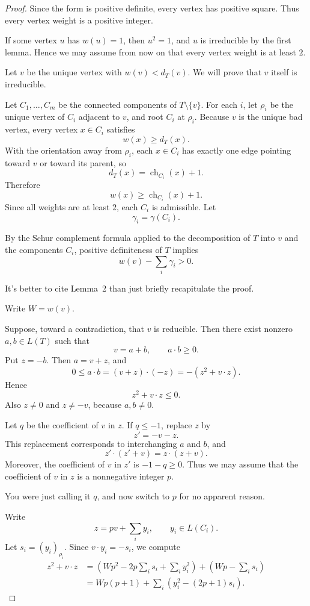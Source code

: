 \documentclass[12pt]{article}
\DeclareMathOperator{\ch}{ch}
\newcommand{\review}[1]{\begin{reviewbox}#1\end{reviewbox}}
\begin{document}
\begin{proof}
Since the form is positive definite, every vertex has positive square. Thus every vertex weight is a positive integer.

If some vertex \(u\) has \(w(u)=1\), then \(u^2=1\), and \(u\) is irreducible by the first lemma. Hence we may assume from now on that every vertex weight is at least \(2\).

Let \(v\) be the unique vertex with \(w(v)<d_T(v)\). We will prove that \(v\) itself is irreducible.

Let \(C_1,\dots,C_m\) be the connected components of \(T\setminus\{v\}\). For each \(i\), let \(\rho_i\) be the unique vertex of \(C_i\) adjacent to \(v\), and root \(C_i\) at \(\rho_i\). Because \(v\) is the unique bad vertex, every vertex \(x\in C_i\) satisfies
\[
w(x)\ge d_T(x).
\]
With the orientation away from \(\rho_i\), each \(x\in C_i\) has exactly one edge pointing toward \(v\) or toward its parent, so
\[
d_T(x)=\ch_{C_i}(x)+1.
\]
Therefore
\[
w(x)\ge \ch_{C_i}(x)+1.
\]
Since all weights are at least \(2\), each \(C_i\) is admissible. Let
\[
\gamma_i=\gamma(C_i).
\]

By the Schur complement formula applied to the decomposition of \(T\) into \(v\) and the components \(C_i\), positive definiteness of \(T\) implies
\[
w(v)-\sum_i\gamma_i>0.
\]
\review{It's better to cite Lemma~2 than just briefly recapitulate the proof.}
Write \(W=w(v)\).

Suppose, toward a contradiction, that \(v\) is reducible. Then there exist nonzero \(a,b\in L(T)\) such that
\[
v=a+b,
\qquad
a\cdot b\ge 0.
\]
Put \(z=-b\). Then \(a=v+z\), and
\[
0\le a\cdot b=(v+z)\cdot(-z)=-(z^2+v\cdot z).
\]
Hence
\[
z^2+v\cdot z\le 0.
\]
Also \(z\ne 0\) and \(z\ne -v\), because \(a,b\ne 0\).

Let \(q\) be the coefficient of \(v\) in \(z\). If \(q\le -1\), replace \(z\) by
\[
z'=-v-z.
\]
This replacement corresponds to interchanging \(a\) and \(b\), and
\[
z'\cdot(z'+v)=z\cdot(z+v).
\]
Moreover, the coefficient of \(v\) in \(z'\) is \(-1-q\ge 0\). Thus we may assume that the coefficient of \(v\) in \(z\) is a nonnegative integer \(p\).
\review{You were just calling it $q$, and now switch to $p$ for no apparent reason.}

Write
\[
z=pv+\sum_i y_i,
\qquad y_i\in L(C_i).
\]
Let \(s_i=(y_i)_{\rho_i}\). Since \(v\cdot y_i=-s_i\), we compute
\begin{align*}
z^2+v\cdot z
&=
\left(Wp^2-2p\sum_i s_i+\sum_i y_i^2\right)
+
\left(Wp-\sum_i s_i\right) \\
&=
Wp(p+1)+\sum_i\left(y_i^2-(2p+1)s_i\right).
\end{align*}


\end{proof}
\end{document}
